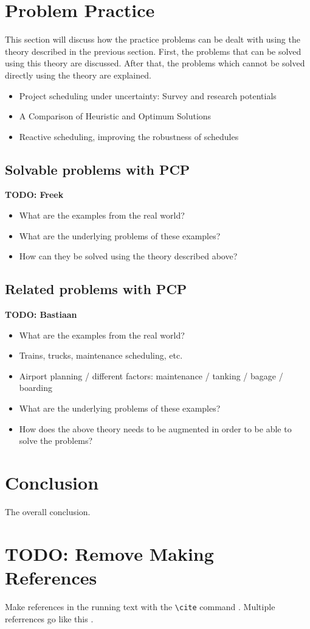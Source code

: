 \documentclass{article}
\newcommand{\TODO}[1]{{\color{red}\textbf{TODO: #1}}}
\begin{document}
\section{Problem Practice}
This section will discuss how the practice problems can be dealt with using the theory described in the previous section. First, the problems that can be solved using this theory are discussed. After that, the problems which cannot be solved directly using the theory are explained.\\

\begin{itemize}
\item Project scheduling under uncertainty: Survey
and research potentials
\item A Comparison of Heuristic and Optimum Solutions
\item Reactive scheduling, improving the robustness of schedules
\end{itemize}

\subsection{Solvable problems with PCP}
\TODO{Freek}
\begin{itemize}
\item What are the examples from the real world? 
\item What are the underlying problems of these examples?
\item How can they be solved using the theory described above?
\end{itemize}

\subsection{Related problems with PCP}
\TODO{Bastiaan}
\begin{itemize}
\item What are the examples from the real world?
\item Trains, trucks, maintenance scheduling, etc.
\item Airport planning / different factors: maintenance / tanking / bagage / boarding
\item What are the underlying problems of these examples?
\item How does the above theory needs to be augmented in order to be able to solve the problems?
\end{itemize}

\section{Conclusion}
The overall conclusion.

\section{\TODO{Remove} Making References}

  Make references in the running text with the \verb+\cite+
  command \cite{dijkstra68}. Multiple referrences go like this
  \cite{charniak85,steels98}.




\end{document}
